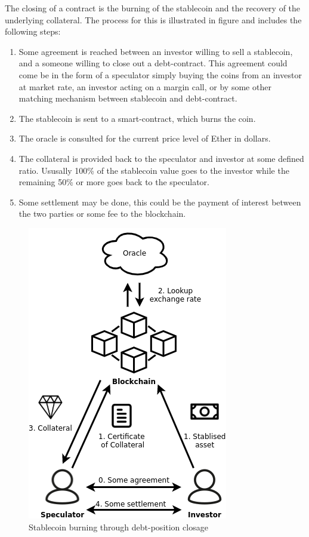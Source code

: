\documentclass[english,]{IEEEtran}
\providecommand{\tightlist}{%
  \setlength{\itemsep}{0pt}\setlength{\parskip}{0pt}}
\begin{document}
The closing of a contract is the burning of the stablecoin and the
recovery of the underlying collateral. The process for this is
illustrated in figure \label{cdp_destroy_label} and includes the
following steps:

\begin{enumerate}
\def\labelenumi{\arabic{enumi}.}
\setcounter{enumi}{-1}
\tightlist
\item
  Some agreement is reached between an investor willing to sell a
  stablecoin, and a someone willing to close out a debt-contract. This
  agreement could come be in the form of a speculator simply buying the
  coins from an investor at market rate, an investor acting on a margin
  call, or by some other matching mechanism between stablecoin and
  debt-contract.
\item
  The stablecoin is sent to a smart-contract, which burns the coin.
\item
  The oracle is consulted for the current price level of Ether in
  dollars.
\item
  The collateral is provided back to the speculator and investor at some
  defined ratio. Ususally 100\% of the stablecoin value goes to the
  investor while the remaining 50\% or more goes back to the speculator.
\item
  Some settlement may be done, this could be the payment of interest
  between the two parties or some fee to the blockchain.
\end{enumerate}

\begin{figure}[htbp]
\centering
\includegraphics{img/CDP_destroy.png}
\caption{Stablecoin burning through debt-position closage
\label{cdp_destroy_label}}
\end{figure}
\end{document}
